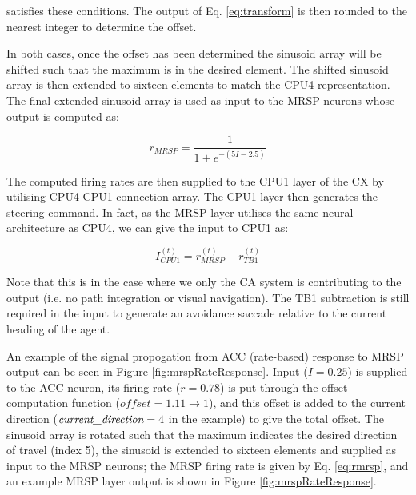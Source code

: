 \documentclass[a4paper,11pt,twoside,openright]{article}
\begin{document}
satisfies these conditions. The output of Eq. \ref{eq:transform} is
then rounded to the nearest integer to determine the offset.  \newline\par

In both cases, once the offset has been determined the sinusoid array
will be shifted such that the maximum is in the desired element. The
shifted sinusoid array is then extended to sixteen elements to match
the CPU4 representation. The final extended sinusoid array is used as
input to the MRSP neurons whose output is computed as:

\begin{equation}
  \label{eq:rmrsp}
  r_{MRSP} = \frac{1}{1 + e^{-(5I - 2.5)}}
\end{equation}

The computed firing rates are then supplied to the CPU1 layer of the
CX by utilising CPU4-CPU1 connection array. The CPU1 layer then
generates the steering command. In fact, as the MRSP layer utilises
the same neural architecture as CPU4, we can give the input to CPU1
as:

\begin{equation}
I_{CPU1}^{(t)} = r_{MRSP}^{(t)} - r_{TB1}^{(t)}
\end{equation}

Note that this is in the case where we only the CA system is
contributing to the output (i.e. no path integration or visual
navigation). The TB1 subtraction is still required in the input to
generate an avoidance saccade relative to the current heading of the
agent.
\newline\par

An example of the signal propogation from ACC (rate-based) response to
MRSP output can be seen in Figure \ref{fig:mrspRateResponse}. Input
($I=0.25$) is supplied to the ACC neuron, its firing rate ($r=0.78$)
is put through the offset computation function ($\textit{offset} =
1.11 \rightarrow 1$), and this offset is added to the current
direction ($\textit{current\textunderscore direction} = 4$ in the
example) to give the total offset. The sinusoid array is rotated such
that the maximum indicates the desired direction of travel (index 5),
the sinusoid is extended to sixteen elements and supplied as input to
the MRSP neurons; the MRSP firing rate is given by Eq. \ref{eq:rmrsp},
and an example MRSP layer output is shown in Figure
\ref{fig:mrspRateResponse}.
\end{document}
